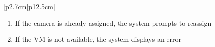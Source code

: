 \begin{table}[H]
\begin{tabular}{|p{2.7cm}|p{12.5cm}|}
\begin{minipage}[t]{\linewidth}
                                      \begin{enumerate}[topsep=0pt,itemsep=1pt,parsep=0pt,partopsep=0pt]
                                          \item If the camera is already assigned, the system prompts to reassign
                                          \item If the VM is not available, the system displays an error
                                      \end{enumerate}
                                  \end{minipage}     \\
        \hline
    \end{tabular}
    \label{tab:admin-assign-camera}
\end{table}
